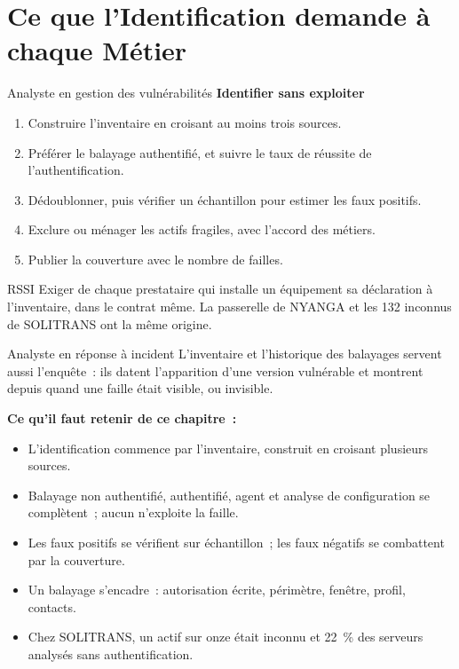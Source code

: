 \section{Ce que l'Identification demande à chaque Métier}
\label{sec:c10-metiers}

\begin{boxmetier}{Analyste en gestion des vulnérabilités}
\textbf{Identifier sans exploiter}
\begin{enumerate}
    \item Construire l'inventaire en croisant au moins trois sources.
    \item Préférer le balayage authentifié, et suivre le taux de réussite
          de l'authentification.
    \item Dédoublonner, puis vérifier un échantillon pour estimer les faux
          positifs.
    \item Exclure ou ménager les actifs fragiles, avec l'accord des métiers.
    \item Publier la couverture avec le nombre de failles.
\end{enumerate}
\end{boxmetier}

\begin{boxmetier}{RSSI}
Exiger de chaque prestataire qui installe un équipement sa déclaration à
l'inventaire, dans le contrat même. La passerelle de NYANGA et les 132
inconnus de SOLITRANS ont la même origine.
\end{boxmetier}

\begin{boxmetier}{Analyste en réponse à incident}
L'inventaire et l'historique des balayages servent aussi l'enquête~: ils
datent l'apparition d'une version vulnérable et montrent depuis quand une
faille était visible, ou invisible.
\end{boxmetier}

\separateur

\begin{boxresume}
\textbf{Ce qu'il faut retenir de ce chapitre~:}
\begin{itemize}
    \item L'identification commence par l'inventaire, construit en
          croisant plusieurs sources.
    \item Balayage non authentifié, authentifié, agent et analyse de
          configuration se complètent~; aucun n'exploite la faille.
    \item Les faux positifs se vérifient sur échantillon~; les faux négatifs
          se combattent par la couverture.
    \item Un balayage s'encadre~: autorisation écrite, périmètre, fenêtre,
          profil, contacts.
    \item Chez SOLITRANS, un actif sur onze était inconnu et 22~\% des
          serveurs analysés sans authentification.
\end{itemize}
\end{boxresume}

